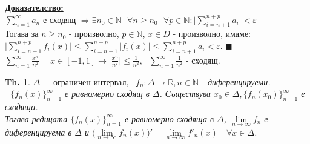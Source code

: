 \documentclass[12pt]{article}
\newcommand{\halfbox}[1]{\rbbox{#1}\quad}
\newtheorem{theorem}{Th.}
\newcommand{\spc}{\text{ }}
\begin{document}
	\textbf{\underline{Доказателство:}}
	\\
	$\sum_{n=1}^{\infty}a_n$ е сходящ $\Rightarrow \exists n_0 \in \mathbb{N} \spc\forall n \geq n_0 \spc\forall p \in \mathbb{N} : \big|\textstyle{\sum_{i=n+1}^{n+p}a_i}\big|<\varepsilon$\\
	Тогава за $n\geq n_0$ - произволно, $p \in \mathbb{N}$, $x\in D$ - произволно, имаме:\\
	$\big|\textstyle{\sum_{i=n+1}^{n+p}f_i(x)}\big|\leq \sum_{i=n+1}^{n+p}\big|f_i(x)\big|\leq \sum_{i=n+1}^{n+p}a_i < \varepsilon.$
	\hfill$\blacksquare$\\
	\halfbox{Пример} $\sum_{n=1}^{\infty}\frac{x^n}{n^2}$
	$\quad x\in [-1,1]\longrightarrow \big|\frac{x^n}{n^2}\big|\leq \frac{1}{n^2},\spc \sum_{n=1}^{\infty}\frac{1}{n^2}$ - сходящ.
	\begin{theorem}
		$\Delta - \text{ ограничен интервал},\spc f_n : \Delta \rightarrow \mathbb{R}, n\in\mathbb{N}$ - диференцируеми. $\spc \{f_n(x)\}_{n=1}^{\infty}$ е равномерно сходящ в $\Delta$. Съществува $x_0 \in \Delta, \{f_n(x_0)\}_{n=1}^{\infty}$ е сходяща.\\
		Тогава редицата $\{f_n(x)\}_{n=1}^{\infty}$ е равномерно сходяща в $\Delta$, $\lim\limits_{n\to\infty}f_n$ е диференцируема в $\Delta$ и $\big(\lim\limits_{n\to\infty}f_n(x)\big)' = \lim\limits_{n\to\infty}f'_n(x)\quad \forall x \in \Delta$.
	\end{theorem}
	
\end{document}
